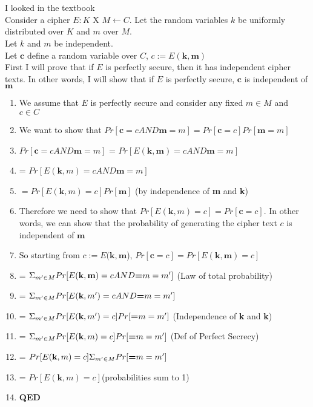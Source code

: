 \documentclass[]{article}
\begin{document}
\section{}
I looked in the textbook
\\
Consider a cipher $E: K$ X $M \leftarrow C$. Let the random variables \textbf{$k$} be uniformly distributed over $K$ and \textbf{$m$} over $M$.
\\
Let \textbf{$k$} and \textbf{$m$} be independent.
\\
Let $\textbf{c}$ define a random variable over $C$, $c := E(\textbf{k},\textbf{m})$
\\
First I will prove that if $E$ is perfectly secure, then it has independent cipher texts. In other words, I will show that if $E$ is perfectly secure, $\textbf{c}$ is independent of $\textbf{m}$
\begin{enumerate}
	\item We assume that $E$ is perfectly secure and consider any fixed $m \in M$ and $c \in C$
	\item We want to show that $Pr[\textbf{c} = c AND \textbf{m} = m] = Pr[\textbf{c}=c]Pr[\textbf{m}=m]$
	\item $Pr[\textbf{c} = c AND \textbf{m} = m]$ = $Pr[E(\textbf{k},\textbf{m})=cAND\textbf{m}=m]$
	\item = $Pr[E(\textbf{k},m)=cAND\textbf{m}=m]$
	\item $= Pr[E(\textbf{k},m)=c]Pr[\textbf{m}]$ (by independence of \textbf{m} and \textbf{k})
	\item Therefore we need to show that $Pr[E(\textbf{k},m)=c]=Pr[\textbf{c}=c]$. In other words, we can show that the probability of generating the cipher text $c$ is independent of $\textbf{m}$
	\item So starting from $c := E(\textbf{k},\textbf{m}$), $Pr[\textbf{c} = c ]=Pr[E(\textbf{k},\textbf{m}) =c]$
	\item = $\Sigma_{m' \in M} Pr[E(\textbf{k},\textbf{m}) =c AND \textbf={m} = m']$ (Law of total probability)
	\item = $\Sigma_{m' \in M} Pr[E(\textbf{k},m') =c AND \textbf={m} = m']$ 
	\item = $\Sigma_{m' \in M} Pr[E(\textbf{k},m') =c]Pr[\textbf={m} = m']$ (Independence of \textbf{k} and \textbf{k})
	\item = $\Sigma_{m' \in M} Pr[E(\textbf{k},m) =c]Pr[\textbf={m} = m']$ (Def of Perfect Secrecy)
	\item = $Pr[E(\textbf{k},m) =c]  \Sigma_{m' \in M} Pr[\textbf={m} = m']$
	\item = $Pr[E(\textbf{k},m) =c] $(probabilities sum to 1)
	\item \textbf{QED} 
\end{enumerate}
\end{document}

